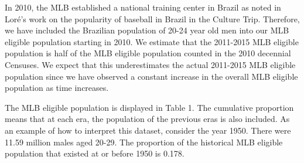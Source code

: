 \documentclass[11pt]{article}\usepackage[]{graphicx}\usepackage[]{color}
\begin{document}
In 2010, the MLB established a national training center in Brazil %
as noted in Lor{\'e}'s work on the popularity of baseball in Brazil in the 
Culture Trip.
Therefore, we have included the Brazilian population of 20-24 year old 
men  
into our MLB eligible population starting in 2010.  
We estimate that the 2011-2015 MLB eligible population is half of the 
MLB eligible population counted in the 2010 decennial Censuses.  We expect 
that this underestimates the actual 2011-2015 MLB eligible population 
since we have observed a constant increase in the overall MLB eligible 
population as time increases. 


The MLB eligible population is displayed in Table 1.
The cumulative proportion means that at each era, the population of the 
previous eras is also included. As an example of how to interpret this 
dataset, consider the year 1950. There were 11.59 
million males aged 20-29. The proportion of the historical MLB eligible 
population that existed at or before 1950 is 0.178. 


\end{document}
